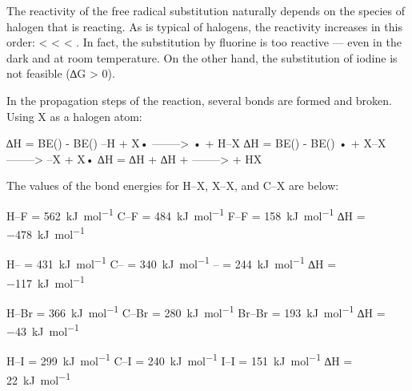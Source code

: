 				The reactivity of the free radical substitution naturally depends on the species of halogen that is reacting.
				As is typical of halogens, the reactivity increases in this order:  <  <  < .
				In fact, the substitution by fluorine is too reactive --- even in the dark and at room temperature. On the other hand,
				the substitution of iodine is not feasible (∆G > 0).

				In the propagation steps of the reaction, several bonds are formed and broken. Using X as a halogen atom:

				\vspace{1em}
				\vbox{∆H = BE() - BE()		\tabto{60mm}–H + X•		\tabto{85mm} ------–> • + H–X	}
				\vbox{∆H = BE() - BE()		\tabto{60mm}• + X–X		\tabto{85mm} ------–> –X + X•	}
				\vbox{∆H = ∆H + ∆H	\tabto{60mm} + 	\tabto{85mm} ------–>  + HX	}

				The values of the bond energies for H–X, X–X, and C–X are below:
				\vspace{1.0em}

				\vbox{
							\tabto{25mm}	H–F			\tabto{50mm} = \SI{562}{\kilo\joule\per\mole}
								\tabto{25mm}	C–F			\tabto{50mm} = \SI{484}{\kilo\joule\per\mole}
								\tabto{25mm}	F–F			\tabto{50mm} = \SI{158}{\kilo\joule\per\mole}
								\tabto{25mm}	∆H	\tabto{50mm} = \SI{-478}{\kilo\joule\per\mole}
				}

				\vspace{1.0em}
				\vbox{
						\tabto{25mm}	H–\ch{\chlorine}				\tabto{50mm} = \SI{431}{\kilo\joule\per\mole}
									\tabto{25mm}	C–\ch{\chlorine}				\tabto{50mm} = \SI{340}{\kilo\joule\per\mole}
									\tabto{25mm}	\ch{\chlorine}–	\tabto{50mm} = \SI{244}{\kilo\joule\per\mole}
									\tabto{25mm}	∆H						\tabto{50mm} = \SI{-117}{\kilo\joule\per\mole}
				}

				\vspace{1.0em}
				\vbox{
						\tabto{25mm}	H–Br		\tabto{50mm} = \SI{366}{\kilo\joule\per\mole}
								\tabto{25mm}	C–Br		\tabto{50mm} = \SI{280}{\kilo\joule\per\mole}
								\tabto{25mm}	Br–Br		\tabto{50mm} = \SI{193}{\kilo\joule\per\mole}
								\tabto{25mm}	∆H	\tabto{50mm} = \SI{-43}{\kilo\joule\per\mole}
				}

				\vspace{1.0em}
				\vbox{
							\tabto{25mm}	H–I			\tabto{50mm} = \SI{299}{\kilo\joule\per\mole}
								\tabto{25mm}	C–I			\tabto{50mm} = \SI{240}{\kilo\joule\per\mole}
								\tabto{25mm}	I–I			\tabto{50mm} = \SI{151}{\kilo\joule\per\mole}
								\tabto{25mm}	∆H	\tabto{50mm} = \SI[retain-explicit-plus]{+22}{\kilo\joule\per\mole}
				}

